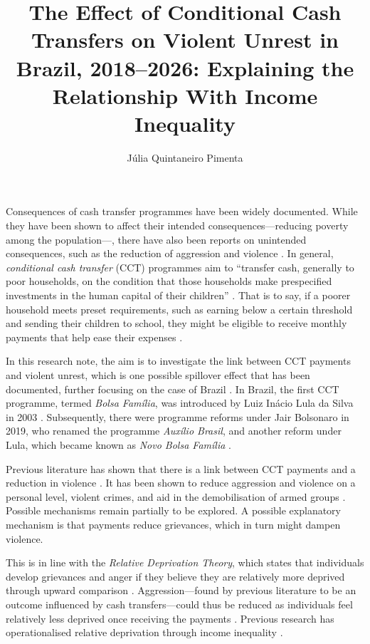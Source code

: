 \documentclass[stu,12pt]{apa7}
\title{The Effect of Conditional Cash Transfers on Violent Unrest in Brazil, 2018–2026: Explaining the Relationship With Income Inequality}
\author{Júlia Quintaneiro Pimenta}
\affiliation{\mbox{Master in the Social Sciences, Universidad Carlos III de Madrid}}
\begin{document}
\maketitle

Consequences of cash transfer programmes have been widely documented. While they have been shown to affect their intended consequences—reducing poverty among the population—, there have also been reports on unintended consequences, such as the reduction of aggression and violence \parencite{greitemeyerImpactPersonalRelative2019, penaCivilConflictConditional2017}. In general, \textit{conditional cash transfer} (CCT) programmes aim to “transfer cash, generally to poor households, on the condition that those households make prespecified investments in the human capital of their children” \parencite[1]{franConditionalCashTransfers}. That is to say, if a poorer household meets preset requirements, such as earning below a certain threshold and sending their children to school, they might be eligible to receive monthly payments that help ease their expenses \parencite{PDFNutsBolts}.

In this research note, the aim is to investigate the link between CCT payments and violent unrest, which is one possible spillover effect that has been documented, further focusing on the case of Brazil \parencite{machadoConditionalCashTransfer2018, chiodaSpilloversConditionalCash2016}. In Brazil, the first CCT programme, termed \textit{Bolsa Família}, was introduced by Luiz Inácio Lula da Silva in 2003 \parencite{PDFNutsBolts}. Subsequently, there were programme reforms under Jair Bolsonaro in 2019, who renamed the programme \textit{Auxílio Brasil}, and another reform under Lula, which became known as \textit{Novo Bolsa Família} \parencite{figueiredoProgramaAuxilioBrasil2022, valeEfeitoAumentoNo2025a}.

Previous literature has shown that there is a link between CCT payments and a reduction in violence \parencite{machadoConditionalCashTransfer2018, chiodaSpilloversConditionalCash2016}. It has been shown to reduce aggression and violence on a personal level, violent crimes, and aid in the demobilisation of armed groups \parencite{greitemeyerImpactPersonalRelative2019, itskovichEconomicInequalityRelative2025, litwinConditionalCashTransfer2019, penaCivilConflictConditional2017}. Possible mechanisms remain partially to be explored. A possible explanatory mechanism is that payments reduce grievances, which in turn might dampen violence.

This is in line with the \textit{Relative Deprivation Theory}, which states that individuals develop grievances and anger if they believe they are relatively more deprived through upward comparison \parencite{smithRelativeDeprivationTheory2020}. Aggression—found by previous literature to be an outcome influenced by cash transfers—could thus be reduced as individuals feel relatively less deprived once receiving the payments \parencite{greitemeyerImpactPersonalRelative2019}. Previous research has operationalised relative deprivation through income inequality \parencite{aransiolaEffectAbsoluteRelative2021}.
\end{document}

